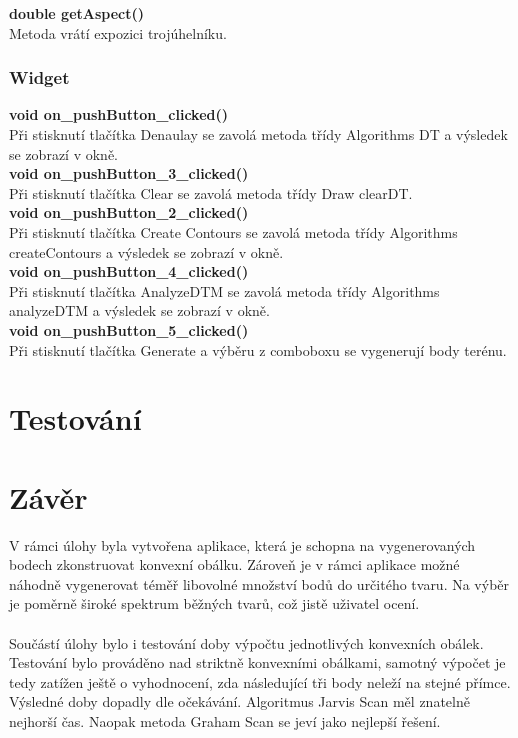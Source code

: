 \documentclass[a4paper, 12pt]{article}
\begin{document}
\textbf{double getAspect()}\\
Metoda vrátí expozici trojúhelníku.\\

\subsubsection{Widget}

\textbf{void on\_pushButton\_clicked()}\\
Při stisknutí tlačítka Denaulay se zavolá metoda třídy Algorithms DT a výsledek se zobrazí v okně.
\\

\textbf{void on\_pushButton\_3\_clicked()}\\
Při stisknutí tlačítka Clear se zavolá metoda třídy Draw clearDT.
\\

\textbf{void on\_pushButton\_2\_clicked()}\\
Při stisknutí tlačítka Create Contours se zavolá metoda třídy Algorithms createContours a výsledek se zobrazí v okně.
\\

\textbf{void on\_pushButton\_4\_clicked()}\\
Při stisknutí tlačítka AnalyzeDTM se zavolá metoda třídy Algorithms analyzeDTM a výsledek se zobrazí v okně.
\\

\textbf{void on\_pushButton\_5\_clicked()}\\
Při stisknutí tlačítka Generate a výběru z comboboxu se vygenerují body terénu.
\\

\section{Testování}


\clearpage
\section{Závěr}
V rámci úlohy byla vytvořena aplikace, která je schopna na vygenerovaných bodech zkonstruovat konvexní obálku. Zároveň je v rámci aplikace možné náhodně vygenerovat téměř libovolné množství bodů do určitého tvaru. Na výběr je poměrně široké spektrum běžných tvarů, což jistě uživatel ocení.\\
\\
Součástí úlohy bylo i testování doby výpočtu jednotlivých konvexních obálek. Testování bylo prováděno nad striktně konvexními obálkami, samotný výpočet je tedy zatížen ještě o vyhodnocení, zda následující tři body neleží na stejné přímce. Výsledné doby dopadly dle očekávání. Algoritmus Jarvis Scan měl znatelně nejhorší čas. Naopak metoda Graham Scan se jeví jako nejlepší řešení.
\end{document}
